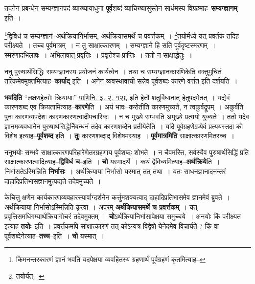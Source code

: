 \documentclass[article,12pt,a4paper]{memoir}
\begin{document}
	  \pstart तदनेन प्रबन्धेन सम्यग्ज्ञानपदं व्याख्यायाधुना \textbf{पूर्व}शब्दं व्याचिख्यासुस्तेन सार्धमस्य विग्रहमाह--\textbf{सम्यग्ज्ञानम्} इति ।
	\pend
	  \bigskip
	  \begingroup
	

	  \pstart \footnote{किमनन्तरकारणं ज्ञानं भवति यदपेक्षया व्यवहितस्य ग्रहणार्थं पूर्वग्रहणं कृतमित्याह--\cite{dp-msD-n}}\-द्विविधं च सम्यग्ज्ञानं--अर्थक्रियानिर्भासम्, अर्थक्रियासमर्थे च प्रवर्त्तकम् । \footnote{तयोर्यत्--\cite{dp-msA} \cite{dp-edP} \cite{dp-edH} \cite{dp-edE} \cite{dp-edN}}\-तयोर्मध्ये यत् प्रवर्तकं तदिह परीक्ष्यते । तच्च पूर्वमात्रम् । न तु साक्षात्कारणम् । सम्यग्ज्ञाने हि सति पूर्वदृष्टस्मरणम् । स्मरणादभिलाषः । अभिलाषात् प्रवृत्तिः । प्रवृत्तेश्च प्राप्तिः । ततो न साक्षाद्धेतुः ।
	\pend
      
	  \endgroup
	

	  \pstart ननु पुरुषार्थसिद्धिः सम्यग्ज्ञानस्य प्रयोजनं कार्यत्वेन । तथा च सम्यग्ज्ञानकारणिकेति वक्तुमुचितं तत्किमेवमुक्तमित्याह--\textbf{कार्याद्} इति । अनेन व्यवस्थावाची सन्नेव पूर्वशब्दः कारणे वर्त्तत इति दर्शयति ।
	\pend
      

	  \pstart \textbf{भवदिति} “लक्षणहेत्वोः क्रियायाः” \href{http://http://sarit.indology.info/?cref=Pā.3.2.126}{पाणिनि. ३. २. १२६} इति हेतौ शतुर्विधानात् हेतुपदमेतत् । यद्येवं कारणशब्द एव क्रियतामित्याह--\textbf{कारणे}ति । अयं भावः--करोतीति कारणमुच्यते, न त्वकुर्वद्रूपम् । अकुर्वति पुनः कारणव्यपदेशः कारणकारणत्वादीपचारिकः । न च मुख्ये सम्भवति अमुख्ये प्रत्ययो युज्यते । ततो यदेव ज्ञानमव्यवधानेन पुरुषार्थसिद्धेर्निबन्धनं तदेव कारणशब्देन प्रतीयेतेति । यदि पूर्वग्रहणेऽप्येवं प्रत्ययस्तदा को विशेष इत्याह--\textbf{पूर्वशब्द} इति । \textbf{तुः} कारणशब्दाद् विशेषमस्याह । \textbf{पूर्वमात्रमिति} साक्षात्कारणमितरच्च ।
	\pend
      

	  \pstart ननूभयोः सम्भवे साक्षात्कारणपरिहारेणेतरग्रहणाय पूर्वशब्दः शोभते । न चैवमस्ति, सर्वस्यैव पुरुषार्थसिद्धिं प्रति साक्षात्कारणत्वादित्याह--\textbf{द्विविधं च}--इति । \textbf{चो} यस्मादर्थे । कथं द्वैविध्यमित्याह--\textbf{अर्थक्रिये}ति । निर्भासतेऽस्मिन्निति \textbf{निर्भासः} । अर्थक्रियाया निर्भासो यस्मात् तत् तथा । यतः साधनज्ञानादनन्तरं दाहादिप्रतिभासज्ञानमुत्पद्यते तदेवमुच्यते ।
	\pend
      

	  \pstart केचित्तु क्षणेन कार्यकारणव्यवहारस्यार्वाग्दर्शनेन कर्त्तुमशक्यत्वाद् दाहादिप्रतिभासमेव ज्ञानमेवं ब्रुवते । अर्थक्रियाया \leavevmode{} निर्भासोऽस्मिन्निति कृत्वा । अपरम् \textbf{अर्थक्रियासमर्थे च प्रवर्त्तकम्} । यत् प्रवृत्तिसमधिगम्यार्थक्रियागोचरं तदेवमुक्तम् । \textbf{चो}ऽर्थक्रियानिर्भासापेक्षया समुच्चये । अनयोः किं परीक्ष्यत इत्याह \textbf{तयोः}--इति । प्रवर्त्तकमपि साक्षात्कारणं तत् कोऽन्यत्र विद्वेषो येनेदमेव विचार्यते ? किं वा पूर्वशब्देनेत्याह--\textbf{तच्च}--इति । \textbf{चो} यस्मात् ।
	\pend
      
\end{document}
